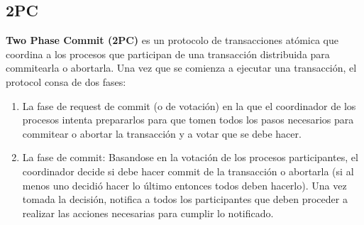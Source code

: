 \subsection{2PC}
\textbf{Two Phase Commit (2PC)} es un protocolo de transacciones atómica que coordina a los procesos que participan de una transacción distribuida para commitearla o abortarla. Una vez que se comienza a ejecutar una transacción, el protocol consa de dos fases:

\begin{enumerate}
	\item La fase de request de commit (o de votación) en la que el coordinador de los procesos intenta prepararlos para que tomen todos los pasos necesarios para commitear o abortar la transacción y a votar que se debe hacer.
	\item La fase de commit: Basandose en la votación de los procesos participantes, el coordinador decide si debe hacer commit de la transacción o abortarla (si al menos uno decidió hacer lo último entonces todos deben hacerlo). Una vez tomada la decisión, notifica a todos los participantes que deben proceder a realizar las acciones necesarias para cumplir lo notificado.
\end{enumerate}

\subsection{}
\subsection{}
\subsection{}
\subsection{}
\subsection{}
\subsection{}

	\section{}
	\section{}
	\section{}
